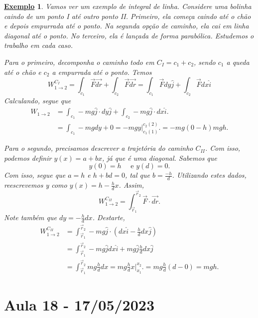 \documentclass{article}
\newtheorem{example}{\underline{Exemplo}}
\begin{document}
\begin{example}
  Vamos ver um exemplo de integral de linha. Considere uma bolinha caindo de um ponto I até
  outro ponto II. Primeiro, ela come\c ca caindo até o chão e depois empurrada até o ponto. Na segunda op\c cão de caminho, ela cai em linha diagonal até o ponto. No terceiro,
  ela é lan\c cada de forma parabólica. Estudemos o trabalho em cada caso.

  Para o primeiro, decomponha o caminho todo em \(C_{I} = c_{1} + c_{2}\), sendo 
  \(c_{1}\) a queda até o chão e \(c_{2}\) a empurrada até o ponto. Temos 
    \[
      W_{1\rightarrow 2 }^{C_{I}} = \int_{c_{1}}^{}\vec{F}\vec{dr} + \int_{c_{2}}^{}\vec{F}\vec{dr} = \int_{c_{1}}^{}\vec{F}dy \hat{j} + \int_{c_{2}}^{}\vec{F}dx \hat{i}
    \]
    Calculando, segue que
   \begin{align*}
     W_{1\rightarrow 2} &= \int_{c_{1}}^{}-mg \hat{j}\cdot dy \hat{j} + \int_{c_{2}}^{}-mg \hat{j}\cdot dx \hat{i}.\\
                        &= \int_{c_{1}}^{}-mg dy + 0 = -mg y\biggl|_{c_{1}(1)}^{c_{2}(2)}\biggr. = -mg(0-h)mgh.
   \end{align*}

   Para o segundo, precisamos descrever a trajetória do caminho \(C_{II}\). Com isso,
   podemos definir \(y(x) = a + bx\), já que é uma diagonal. Sabemos que 
     \[
       y(0) = h\quad\text{ e } y(d) = 0.
     \]
    Com isso, segue que \(a = h\) e \(h + bd = 0\), tal que \(b = \frac{-h}{d}.\) Utilizando estes dados,
    reescrevemos y como \(y(x) = h - \frac{h}{d}x\). Assim, 
      \[
        W_{1\rightarrow 2}^{C_{II}} = \int_{\vec{r}_{1}}^{\vec{r}_{2}}\vec{F} \cdot \vec{dr}.
      \]
      Note também que \(dy = -\frac{h}{d}dx\). Destarte, 
     \begin{align*}
       W_{1\rightarrow 2}^{C_{II}} &= \int_{\vec{r}_{1}}^{\vec{r}_{2}}-mg \hat{j}\cdot (dx \hat{i} - \frac{h}{d}dx \hat{j})\\
                                   &= \int_{\vec{r}_{1}}^{\vec{r}_{2}}-mg \hat{j}dx \hat{i} + mg \hat{j}\frac{h}{d}dx \hat{j}\\
                                   &= \int_{\vec{r}_{1}}^{\vec{r}_{2}}mg \frac{h}{d} dx = mg \frac{h}{d}x \biggl|_{x_{1}}^{x_{2}}\biggr. = mg \frac{h}{d}(d-0) = mgh.
     \end{align*}
\end{example}
\newpage

\section{Aula 18 - 17/05/2023}
\end{document}
